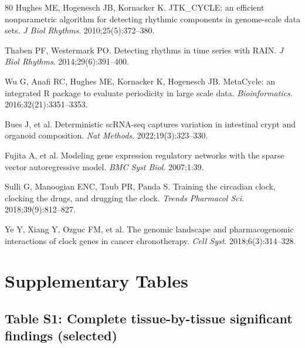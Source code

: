 \documentclass[11pt,a4paper]{article}
\begin{document}
\begin{thebibliography}{80}
Hughes ME, Hogenesch JB, Kornacker K. JTK\_CYCLE: an efficient nonparametric algorithm for detecting rhythmic components in genome-scale data sets. \textit{J Biol Rhythms}. 2010;25(5):372--380.

Thaben PF, Westermark PO. Detecting rhythms in time series with RAIN. \textit{J Biol Rhythms}. 2014;29(6):391--400.

Wu G, Anafi RC, Hughes ME, Kornacker K, Hogenesch JB. MetaCycle: an integrated R package to evaluate periodicity in large scale data. \textit{Bioinformatics}. 2016;32(21):3351--3353.

Bues J, et al. Deterministic scRNA-seq captures variation in intestinal crypt and organoid composition. \textit{Nat Methods}. 2022;19(3):323--330.

Fujita A, et al. Modeling gene expression regulatory networks with the sparse vector autoregressive model. \textit{BMC Syst Biol}. 2007;1:39.

Sulli G, Manoogian ENC, Taub PR, Panda S. Training the circadian clock, clocking the drugs, and drugging the clock. \textit{Trends Pharmacol Sci}. 2018;39(9):812--827.

Ye Y, Xiang Y, Ozguc FM, et al. The genomic landscape and pharmacogenomic interactions of clock genes in cancer chronotherapy. \textit{Cell Syst}. 2018;6(3):314--328.

\end{thebibliography}

\newpage
\section*{Supplementary Tables}

\subsection*{Table S1: Complete tissue-by-tissue significant findings (selected)}
\end{document}
